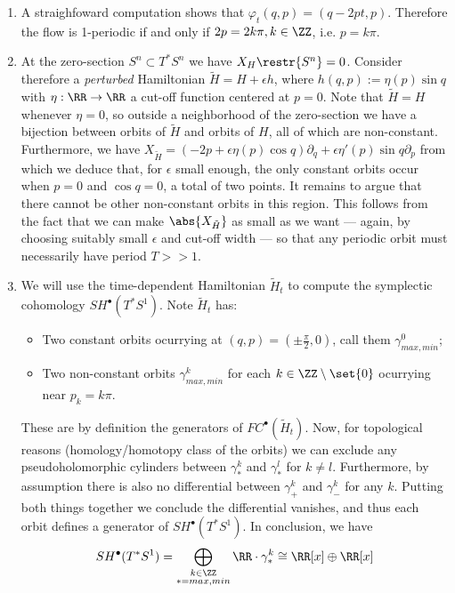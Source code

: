 
 
\begin{enumerate}
    \item A straighfoward computation shows that  $\varphi_t(q,p)=(q-2pt,p)$. Therefore the flow is 1-periodic if and only if
    $2p=2k\pi, k\in \ZZ$, i.e. $p=k\pi$.
    \item At the zero-section $S^n\subset T^*S^n$ we have $X_H\restr{S^n}=0$. Consider therefore a {\it perturbed} Hamiltonian $\tilde H=H+\epsilon h$, where $h(q,p):=\eta(p)\sin q$ with $\eta:\RR\to \RR$  a cut-off function centered at $p=0$. Note that $\tilde H=H$ whenever $\eta=0$, so outside a neighborhood of the zero-section we have a bijection between orbits of $\tilde H$ and orbits of $H$, all of which are non-constant. Furthermore, we have $X_{\tilde H}=(-2p+\epsilon\eta(p)\cos q)\partial_q +\epsilon\eta'(p)\sin q\partial_p$ from which we deduce that, for $\epsilon$ small enough, the only constant orbits occur when $p=0$ and $\cos q=0$, a total of two points. It remains to argue that there cannot be other non-constant orbits in this region. This follows from the fact that we can make $\abs{X_{\tilde H}}$ as small as we want --- again, by choosing suitably small $\epsilon$ and cut-off width --- so that any periodic orbit must necessarily have period $T>>1$.
    
    \item We will use the time-dependent Hamiltonian $\tilde H_t$ to compute the symplectic cohomology $SH^\bullet(T^*S^1)$. Note $\tilde H_t$  has:
    \begin{itemize}
        \item Two constant orbits ocurrying at $(q,p)=\left(\pm \frac{\pi}{2},0\right)$, call them $\gamma^0_{max,min}$;
        \item Two non-constant orbits $\gamma_{max,min}^k$ for each $k\in \ZZ\setminus\set{0}$ ocurrying near $p_k=k\pi$.
    \end{itemize}
    These are by definition the generators of $FC^\bullet(\tilde H_t)$. Now, for topological reasons (homology/homotopy class of the orbits) we can exclude any pseudoholomorphic cylinders between $\gamma^k_*$ and $\gamma^l_*$ for $k\neq l$. Furthermore, by assumption there is also no differential between $\gamma^k_+$ and $\gamma^k_-$ for any $k$. Putting both things together we conclude the differential vanishes, and thus each orbit defines a generator of $SH^\bullet(T^*S^1)$. In conclusion, we have
    $$
    SH^\bullet(T^*S^1)=\bigoplus_{\substack{k\in\ZZ \\ *=max,min}}\RR\cdot \gamma^k_*\cong \RR[x]\oplus\RR[x]
    $$
    

\end{enumerate}
